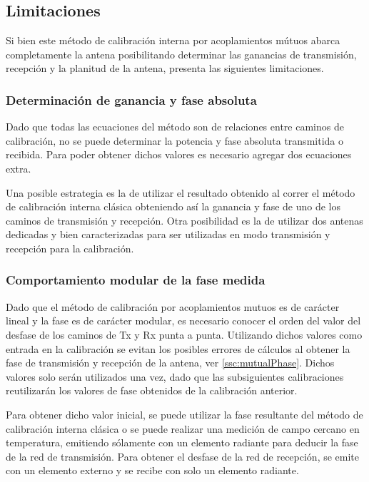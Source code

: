 \subsection{Limitaciones}

Si bien este método de calibración interna por acoplamientos mútuos abarca completamente la antena posibilitando determinar las
ganancias de transmisión, recepción y la planitud de la antena, presenta las siguientes limitaciones.


\subsubsection{Determinación de ganancia y fase absoluta}

Dado que todas las ecuaciones del método son de relaciones entre caminos de calibración, no se puede determinar la potencia y
fase absoluta transmitida o recibida. Para poder obtener dichos valores es necesario agregar dos ecuaciones extra.

Una posible estrategia es la de utilizar el resultado obtenido al correr el método de calibración interna clásica obteniendo
así la ganancia y fase de uno de los caminos de transmisión y recepción. Otra posibilidad es la de utilizar dos antenas
dedicadas y bien caracterizadas para ser utilizadas en modo transmisión y recepción para la calibración.


\subsubsection{Comportamiento modular de la fase medida}

Dado que el método de calibración por acoplamientos mutuos es de carácter lineal y la fase es de carácter modular, es necesario 
conocer el orden del valor del desfase de los caminos de Tx y Rx punta a punta. Utilizando dichos valores como entrada en la
calibración se evitan los posibles errores de cálculos al obtener la fase de transmisión y recepción de la antena, ver
\ref{ssc:mutualPhase}. Dichos valores solo serán utilizados una vez, dado que las subsiguientes calibraciones reutilizarán los
valores de fase obtenidos de la calibración anterior.

Para obtener dicho valor inicial, se puede utilizar la fase resultante del método de calibración interna clásica o se puede
realizar una medición de campo cercano en temperatura, emitiendo sólamente con un elemento radiante para deducir la fase de la
red de transmisión. Para obtener el desfase de la red de recepción, se emite con un elemento externo y se recibe con solo un
elemento radiante.


